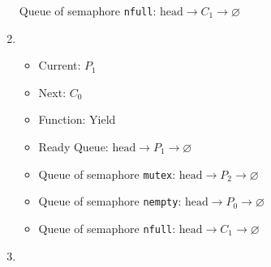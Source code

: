\documentclass[11pt]{article}
\begin{document}
\begin{question}
\begin{enumerate}
{\begin{itemize}
{                            Queue of semaphore {\tt nfull}: $\text{head}\longrightarrow
                            C_{1}\longrightarrow
                            \varnothing$
                        }
                \end{itemize}
                }
                \item {
                    \begin{itemize}
                        \item{Current: $P_{1}$}
                        \item{Next: $C_{0}$}
                        \item{Function: Yield}
                        \item{
                            Ready Queue: $\text{head}\longrightarrow
                            P_{1}\longrightarrow
                            \varnothing$
                        } \item{
                            Queue of semaphore {\tt mutex}: $\text{head}\longrightarrow
                            P_{2}\longrightarrow
                            \varnothing$
                        }
                        \item{
                            Queue of semaphore {\tt nempty}: $\text{head}\longrightarrow
                            P_{0}\longrightarrow
                            \varnothing$
                        }
                        \item{
                            Queue of semaphore {\tt nfull}: $\text{head}\longrightarrow
                            C_{1}\longrightarrow
                            \varnothing$
                        }
                \end{itemize}
                }
                \item {
                    }
\end{enumerate}
\end{question}
\end{document}
